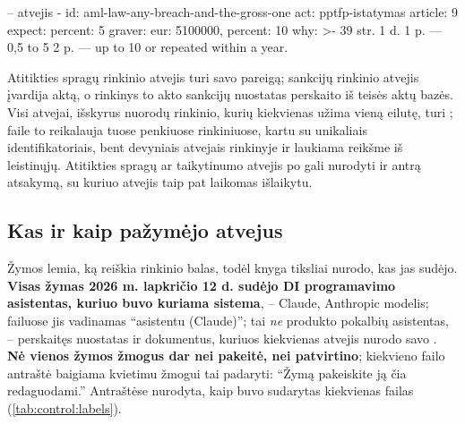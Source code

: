 \begin{codefile}{ -- atvejis }
  - id: aml-law-any-breach-and-the-gross-one
    act: pptfp-istatymas
    article: 9
    expect: {percent: 5}
    graver: {eur: 5100000, percent: 10}
    why: >-
      39 str. 1 d. 1 p. — 0,5 to 5 %
      2 p. — up to 10 %
      or repeated within a year.
\end{codefile}

Atitikties spragų rinkinio atvejis turi savo pareigą; sankcijų rinkinio atvejis įvardija
aktą, o rinkinys to akto sankcijų nuostatas perskaito iš teisės aktų bazės. Visi atvejai,
išskyrus nuorodų rinkinio, kurių kiekvienas užima vieną eilutę, turi ;
 faile  to reikalauja tuose
penkiuose rinkiniuose, kartu su unikaliais identifikatoriais, bent devyniais atvejais
rinkinyje ir laukiama reikšme iš leistinųjų. Atitikties spragų ar taikytinumo atvejis po
 gali nurodyti ir antrą atsakymą, su kuriuo atvejis taip pat laikomas
išlaikytu.

\subsection{Kas ir kaip pažymėjo atvejus}\label{sec:control:labels}

Žymos lemia, ką reiškia rinkinio balas, todėl knyga tiksliai nurodo, kas jas sudėjo.
\textbf{Visas žymas 2026 m. lapkričio 12 d. sudėjo DI programavimo asistentas, kuriuo buvo
kuriama sistema}, -- Claude, Anthropic modelis; failuose jis vadinamas \enquote{asistentu
(Claude)}; tai \emph{ne} produkto pokalbių asistentas, -- perskaitęs nuostatas ir dokumentus,
kuriuos kiekvienas atvejis nurodo savo . \textbf{Nė vienos žymos žmogus dar nei
pakeitė, nei patvirtino}; kiekvieno failo antraštė baigiama kvietimu žmogui tai padaryti:
\enquote{Žymą pakeiskite ją čia redaguodami.} Antraštėse nurodyta, kaip buvo sudarytas
kiekvienas failas (\cref{tab:control:labels}).

